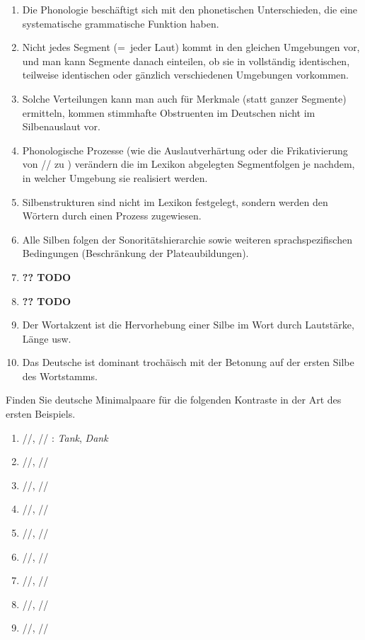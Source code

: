 \Zusammenfassung

\begin{enumerate}
  \item Die Phonologie beschäftigt sich mit den phonetischen Unterschieden, die eine systematische grammatische Funktion haben.
  \item Nicht jedes Segment (=~jeder Laut) kommt in den gleichen Umgebungen vor, und man kann Segmente danach einteilen, ob sie in vollständig identischen, teilweise identischen oder gänzlich verschiedenen Umgebungen vorkommen.
  \item Solche Verteilungen kann man auch für Merkmale (statt ganzer Segmente) ermitteln, \zB kommen stimmhafte Obstruenten im Deutschen nicht im Silbenauslaut vor.
  \item Phonologische Prozesse (wie die Auslautverhärtung oder die Frikativierung von // zu \textipa{[i\c{c}]}) verändern die im Lexikon abgelegten Segmentfolgen je nachdem, in welcher Umgebung sie realisiert werden.
  \item Silbenstrukturen sind nicht im Lexikon festgelegt, sondern werden den Wörtern durch einen Prozess zugewiesen.
  \item Alle Silben folgen der Sonoritätshierarchie sowie weiteren sprachspezifischen Bedingungen (\zB Beschränkung der Plateaubildungen).
  \item \textbf{?? TODO}
  \item \textbf{?? TODO}
  \item Der Wortakzent ist die Hervorhebung einer Silbe im Wort durch Lautstärke, Länge usw.
  \item Das Deutsche ist dominant trochäisch mit der Betonung auf der ersten Silbe des Wortstamms.
\end{enumerate}

\Uebungen

\Uebung \label{u41} Finden Sie deutsche Minimalpaare für die folgenden Kontraste in der Art des ersten Beispiels.

\begin{enumerate}\Lf
  \item{//, // : \textit{Tank}, \textit{Dank}}
  \item{//, //}
  \item{//, //}
  \item{//, //}
  \item{//, //}
  \item{//, //}
  \item{//, //}
  \item{//, //}
  \item{//, //}
\end{enumerate}


